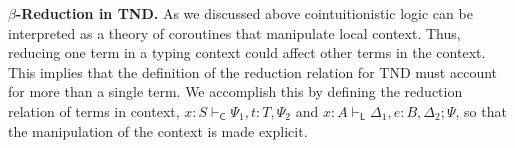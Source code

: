 \documentclass{lmcs}
\newcommand{\DualLNLLogicnt}[1]{\mathit{#1}}
\newcommand{\DualLNLLogicmv}[1]{\mathit{#1}}
\newcommand{\DualLNLLogicsym}[1]{#1}
\begin{document}
\textbf{$\beta$-Reduction in TND.} As we discussed above
cointuitionistic logic can be interpreted as a theory of coroutines that
manipulate local context.  Thus, reducing one term in a typing context
could affect other terms in the context.  This implies that the
definition of the reduction relation for TND must account for more
than a single term. We accomplish this by defining the reduction
relation of terms in context, $ \DualLNLLogicmv{x}  :  \DualLNLLogicnt{S}  \vdash_{\mathsf{C} }  \Psi_{{\mathrm{1}}}  \DualLNLLogicsym{,}  \DualLNLLogicnt{t}  \DualLNLLogicsym{:}  \DualLNLLogicnt{T}  \DualLNLLogicsym{,}  \Psi_{{\mathrm{2}}} $ and $ \DualLNLLogicmv{x}  :  \DualLNLLogicnt{A}  \vdash_{\mathsf{L} }  \Delta_{{\mathrm{1}}}  \DualLNLLogicsym{,}  \DualLNLLogicnt{e}  \DualLNLLogicsym{:}  \DualLNLLogicnt{B}  \DualLNLLogicsym{,}  \Delta_{{\mathrm{2}}} ; \Psi $, so that the manipulation of the context
is made explicit.
\end{document}
